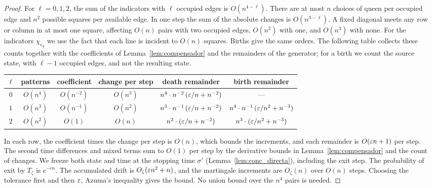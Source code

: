 \begin{proof} For $\ell=0,1,2$, the sum of the indicators with $\ell$ occupied edges is $O(n^{4-\ell})$.
There are at most $n$ choices
of queen per occupied edge and $n^2$ possible squares per available edge. In one step the sum of the
absolute changes is
$O(n^{3-\ell})$. A fixed diagonal meets any row or column in at most one square, affecting $O(n)$ pairs with
two occupied edges,
$O(n^2)$ with one, and $O(n^3)$ with none. For the indicators $\chi_{e_g}$ we use the fact that each line is
incident to $O(n)$
squares. Births give the same orders. The following table collects these counts together with the
coefficients of
Lemma~\ref{lem:compensador} and the remainders of the generator; for a birth we count the source state, with
$\ell-1$ occupied edges,
and not the resulting state.
\begin{center}\small
\begin{tabular}{@{}cccccc@{}}
\toprule
$\ell$ & patterns & coefficient & change per step & death remainder & birth remainder\\
\midrule
$0$ & $O(n^4)$ & $O(n^{-2})$ & $O(n^3)$ & $n^4\cdot n^{-2}\,(\varepsilon/n+n^{-2})$ & ---\\
$1$ & $O(n^3)$ & $O(n^{-1})$ & $O(n^2)$ & $n^3\cdot n^{-1}\,(\varepsilon/n+n^{-2})$
 & $n^4\cdot n^{-1}\,(\varepsilon/n^2+n^{-3})$\\
$2$ & $O(n^2)$ & $O(1)$ & $O(n)$ & $n^2\cdot(\varepsilon/n+n^{-2})$ & $n^3\cdot(\varepsilon/n^2+n^{-3})$\\
\bottomrule
\end{tabular}
\end{center}
In each row, the coefficient times the change per step is $O(n)$, which bounds the increments, and each
remainder is $O(\varepsilon n+1)$
per step. The second time differences and mixed terms sum to $O(1)$ per step by the derivative bounds in
Lemma~\ref{lem:compensador} and
the count of changes. We freeze both state and time at the stopping time $\sigma'$
(Lemma~\ref{lem:conc_directa}), including the exit
step. The probability of exit by $T_\zeta$ is $e^{-cn}$. The accumulated drift is $O_\zeta(\varepsilon n^2+n)$, and
the martingale increments
are $O_\zeta(n)$ over $O(n)$ steps. Choosing the tolerance first and then $\varepsilon$, Azuma's inequality gives
the bound. No union bound
over the $n^4$ pairs is needed. \end{proof}
